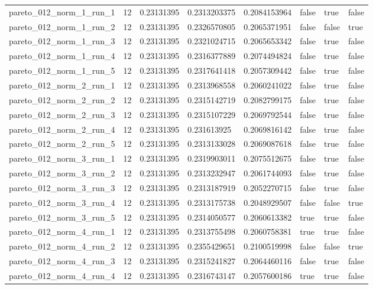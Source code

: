 \begin{tabular}{@{}llllllll@{}}
pareto\_012\_norm\_1\_run\_1 & 12 & 0.23131395 & 0.2313203375 & 0.2084153964 & false & true & false \\
pareto\_012\_norm\_1\_run\_2 & 12 & 0.23131395 & 0.2326570805 & 0.2065371951 & false & false & true \\
pareto\_012\_norm\_1\_run\_3 & 12 & 0.23131395 & 0.2321024715 & 0.2065653342 & false & true & false \\
pareto\_012\_norm\_1\_run\_4 & 12 & 0.23131395 & 0.2316377889 & 0.2074494824 & false & true & false \\
pareto\_012\_norm\_1\_run\_5 & 12 & 0.23131395 & 0.2317641418 & 0.2057309442 & false & true & false \\
pareto\_012\_norm\_2\_run\_1 & 12 & 0.23131395 & 0.2313968558 & 0.2060241022 & false & true & false \\
pareto\_012\_norm\_2\_run\_2 & 12 & 0.23131395 & 0.2315142719 & 0.2082799175 & false & true & false \\
pareto\_012\_norm\_2\_run\_3 & 12 & 0.23131395 & 0.2315107229 & 0.2069792544 & false & true & false \\
pareto\_012\_norm\_2\_run\_4 & 12 & 0.23131395 & 0.231613925 & 0.2069816142 & false & true & false \\
pareto\_012\_norm\_2\_run\_5 & 12 & 0.23131395 & 0.2313133028 & 0.2069087618 & false & true & false \\
pareto\_012\_norm\_3\_run\_1 & 12 & 0.23131395 & 0.2319903011 & 0.2075512675 & false & true & false \\
pareto\_012\_norm\_3\_run\_2 & 12 & 0.23131395 & 0.2313232947 & 0.2061744093 & false & true & false \\
pareto\_012\_norm\_3\_run\_3 & 12 & 0.23131395 & 0.2313187919 & 0.2052270715 & false & true & false \\
pareto\_012\_norm\_3\_run\_4 & 12 & 0.23131395 & 0.2313175738 & 0.2048929507 & false & false & true \\
pareto\_012\_norm\_3\_run\_5 & 12 & 0.23131395 & 0.2314050577 & 0.2060613382 & true & true & false \\
pareto\_012\_norm\_4\_run\_1 & 12 & 0.23131395 & 0.2313755498 & 0.2060758381 & true & true & false \\
pareto\_012\_norm\_4\_run\_2 & 12 & 0.23131395 & 0.2355429651 & 0.2100519998 & false & false & true \\
pareto\_012\_norm\_4\_run\_3 & 12 & 0.23131395 & 0.2315241827 & 0.2064460116 & false & true & false \\
pareto\_012\_norm\_4\_run\_4 & 12 & 0.23131395 & 0.2316743147 & 0.2057600186 & true & true & false \\

\end{tabular}
